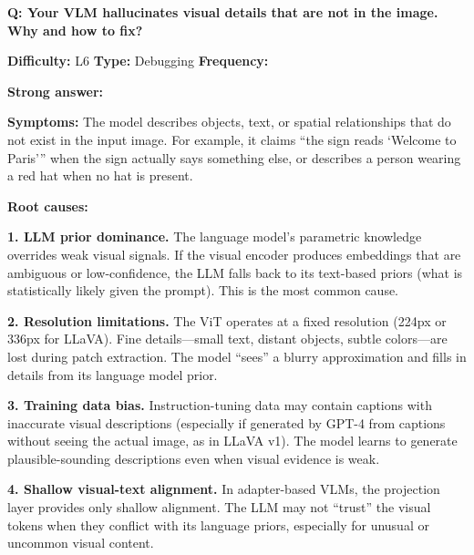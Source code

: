 \begin{interviewq}
\textbf{Q: Your VLM hallucinates visual details that are not in the image. Why and how to fix?}

\textbf{Difficulty:} L6 \quad \textbf{Type:} Debugging \quad \textbf{Frequency:} \freqhigh{}

\textbf{Strong answer:}

\textbf{Symptoms:} The model describes objects, text, or spatial relationships that do not exist in the input image. For example, it claims ``the sign reads `Welcome to Paris''' when the sign actually says something else, or describes a person wearing a red hat when no hat is present.

\textbf{Root causes:}

\textbf{1. LLM prior dominance.} The language model's parametric knowledge overrides weak visual signals. If the visual encoder produces embeddings that are ambiguous or low-confidence, the LLM falls back to its text-based priors (what is statistically likely given the prompt). This is the most common cause.

\textbf{2. Resolution limitations.} The ViT operates at a fixed resolution (224px or 336px for LLaVA). Fine details---small text, distant objects, subtle colors---are lost during patch extraction. The model ``sees'' a blurry approximation and fills in details from its language model prior.

\textbf{3. Training data bias.} Instruction-tuning data may contain captions with inaccurate visual descriptions (especially if generated by GPT-4 from captions without seeing the actual image, as in LLaVA v1). The model learns to generate plausible-sounding descriptions even when visual evidence is weak.

\textbf{4. Shallow visual-text alignment.} In adapter-based VLMs, the projection layer provides only shallow alignment. The LLM may not ``trust'' the visual tokens when they conflict with its language priors, especially for unusual or uncommon visual content.


\end{interviewq}
